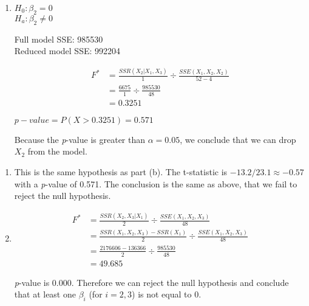 \documentclass{article}
\begin{document}
\newpage
\begin{enumerate}
\def\labelenumi{\alph{enumi})}
\setcounter{enumi}{1}
\item

\(H_0: \beta_2 = 0\) \\
\(H_a: \beta_2 \ne 0\)

Full model SSE: 985530 \\
Reduced model SSE: 992204

\begin{align*}
F^* &= \frac{SSR(X_2 | X_1, X_3)}{1} \div \frac{SSE(X_1, X_2, X_2)}{52 - 4} \\
    &= \frac{6675}{1} \div \frac{985530}{48} \\
    &= 0.3251
\end{align*}

\(p-value = P(X > 0.3251) = 0.571\)

Because the \emph{p}-value is greater than \(\alpha = 0.05\), we
conclude that we can drop \(X_2\) from the model.
\end{enumerate}

\begin{enumerate}
\def\labelenumi{\alph{enumi})}
\setcounter{enumi}{2}
\item
  This is the same hypothesis as part (b). The t-statistic is
  \(-13.2 / 23.1 \approx -0.57\) with a \emph{p}-value of 0.571. The
  conclusion is the same as above, that we fail to reject the null
  hypothesis.
\item
  \begin{align*}
   F^* &= \frac{SSR(X_2, X_3 | X_1)}{2} \div \frac{SSE(X_1, X_2, X_3)}{48} \\
       &= \frac{SSR(X_1, X_2, X_3) - SSR(X_1)}{2} \div \frac{SSE(X_1, X_2, X_3)}{48} \\
       &= \frac{2176606 - 136366}{2} \div \frac{985530}{48} \\
       &= 49.685
  \end{align*}
  
  \emph{p}-value is 0.000. Therefore we can reject the null hypothesis and
conclude that at least one \(\beta_i\) (for \(i = 2,3\)) is not equal to
0.
\end{enumerate}


    
    
    
    
\end{document}
